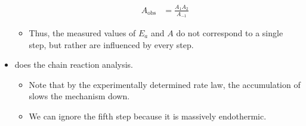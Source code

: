 \documentclass[../notes.tex]{subfiles}
\begin{document}
\begin{itemize}
\begin{itemize}
\begin{align*}
            A_\text{obs} &= \frac{A_1A_2}{A_{-1}}
        \end{align*}
        \item Thus, the measured values of $E_a$ and $A$ do not correspond to a single step, but rather are influenced by every step.
    \end{itemize}
    \item \textcite{bib:McQuarrieSimon} does the  chain reaction analysis.
    \begin{itemize}
        \item Note that by the experimentally determined rate law, the accumulation of  slows the mechanism down.
        \item We can ignore the fifth step because it is massively endothermic.
    \end{itemize}
\end{itemize}
\end{document}
